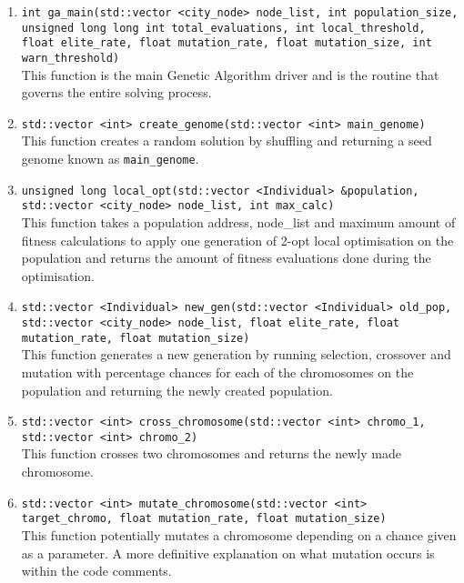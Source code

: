 \documentclass[12pt]{article}
\begin{document}
\begin{enumerate}
	\item \texttt{int ga\_main(std::vector <city\_node> node\_list, int population\_size, unsigned long long int total\_evaluations, int local\_threshold, float elite\_rate, float mutation\_rate, float mutation\_size, int warn\_threshold)}\\
	This function is the main Genetic Algorithm driver and is the routine that governs the entire solving process.
	
	\item \texttt{std::vector <int> create\_genome(std::vector <int> main\_genome)}\\
	This function creates a random solution by shuffling and returning a seed genome known as \texttt{main\_genome}.
	
	\item \texttt{unsigned long local\_opt(std::vector <Individual> \&population, std::vector <city\_node> node\_list, int max\_calc)}\\
	This function takes a population address, node\_list and maximum amount of fitness calculations to apply one generation of 2-opt local optimisation on the population and returns the amount of fitness evaluations done during the optimisation.
	
	\item \texttt{std::vector <Individual> new\_gen(std::vector <Individual> old\_pop, std::vector <city\_node> node\_list, float elite\_rate, float mutation\_rate, float mutation\_size)}\\
	This function generates a new generation by running selection, crossover and mutation with percentage chances for each of the chromosomes on the population and returning the newly created population.
	
	\item \texttt{std::vector <int> cross\_chromosome(std::vector <int> chromo\_1, std::vector <int> chromo\_2)}\\
	This function crosses two chromosomes and returns the newly made chromosome.
	
	\item \texttt{std::vector <int> mutate\_chromosome(std::vector <int> target\_chromo, float mutation\_rate, float mutation\_size)}\\
	This function potentially mutates a chromosome depending on a chance given as a parameter. A more definitive explanation on what mutation occurs is within the code comments.
	
	
\end{enumerate}
\end{document}
